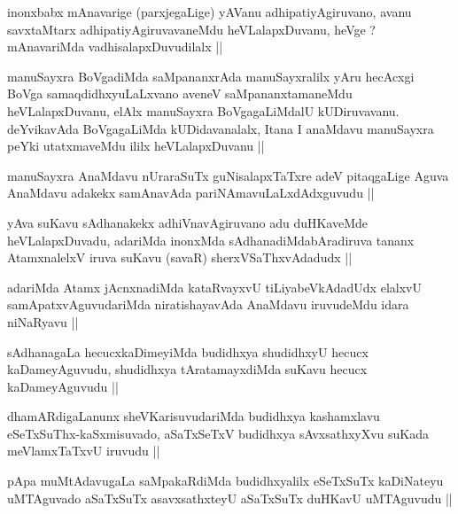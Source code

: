 \begin{artha}
inonxbabx mAnavarige (parxjegaLige) yAVanu adhipatiyAgiruvano, avanu
savxtaMtarx adhipatiyAgiruvavaneMdu heVLalapxDuvanu, heVge ?
mAnavariMda vadhisalapxDuvudilalx ||
\end{artha}


\begin{artha}
manuSayxra BoVgadiMda saMpananxrAda manuSayxralilx yAru hecAcxgi BoVga
samaqdidhxyuLaLxvano aveneV saMpananxtamaneMdu heVLalapxDuvanu, elAlx
manuSayxra BoVgagaLiMdalU kUDiruvavanu. deYvikavAda BoVgagaLiMda
kUDidavanalalx, Itana I anaMdavu manuSayxra peYki utatxmaveMdu ililx
heVLalapxDuvanu ||
\end{artha}

\begin{artha}
manuSayxra AnaMdavu nUraraSuTx guNisalapxTaTxre adeV pitaqgaLige Aguva
AnaMdavu adakekx samAnavAda pariNAmavuLaLxdAdxguvudu ||
\end{artha}

\begin{artha}
yAva suKavu sAdhanakekx adhiVnavAgiruvano adu duHKaveMde
heVLalapxDuvadu, adariMda inonxMda sAdhanadiMdabAradiruva tananx
AtamxnalelxV iruva suKavu (savaR) sherxVSaThxvAdadudx ||
\end{artha}

\begin{artha}
adariMda Atamx jAcnxnadiMda kataRvayxvU tiLiyabeVkAdadUdx elalxvU
samApatxvAguvudariMda niratishayavAda AnaMdavu iruvudeMdu idara
niNaRyavu ||
\end{artha}

\begin{artha}
sAdhanagaLa hecucxkaDimeyiMda budidhxya shudidhxyU hecucx
kaDameyAguvudu, shudidhxya tAratamayxdiMda suKavu hecucx
kaDameyAguvudu ||
\end{artha}

\begin{artha}
dhamARdigaLanunx sheVKarisuvudariMda budidhxya kashamxlavu
eSeTxSuThx-kaSxmisuvado, aSaTxSeTxV budidhxya sAvxsathxyXvu suKada
meVlamxTaTxvU iruvudu ||
\end{artha}

\begin{artha}
pApa muMtAdavugaLa saMpakaRdiMda budidhxyalilx eSeTxSuTx kaDiNateyu
uMTAguvado aSaTxSuTx asavxsathxteyU aSaTxSuTx duHKavU uMTAguvudu ||
\end{artha}


